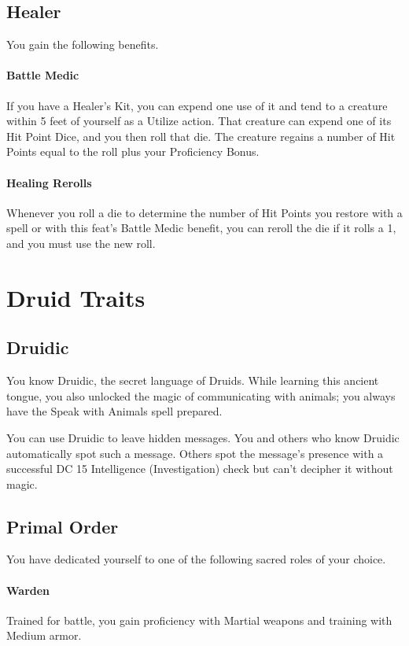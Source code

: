 \documentclass[letterpaper,openany,oneside,twocolumn]{book}
\begin{document}
\subsection*{Healer}
You gain the following benefits.

\paragraph*{Battle Medic} If you have a Healer's Kit, you can expend one use of it and tend to a creature within 5 feet of yourself as a Utilize action. That creature can expend one of its Hit Point Dice, and you then roll that die. The creature regains a number of Hit Points equal to the roll plus your Proficiency Bonus.

\paragraph*{Healing Rerolls} Whenever you roll a die to determine the number of Hit Points you restore with a spell or with this feat's Battle Medic benefit, you can reroll the die if it rolls a 1, and you must use the new roll.

\section*{Druid Traits}
\subsection*{Druidic}
You know Druidic, the secret language of Druids. While learning this ancient tongue, you also unlocked the magic of communicating with animals; you always have the Speak with Animals spell prepared.

You can use Druidic to leave hidden messages. You and others who know Druidic automatically spot such a message. Others spot the message's presence with a successful DC 15 Intelligence (Investigation) check but can't decipher it without magic.
\subsection*{Primal Order}
You have dedicated yourself to one of the following sacred roles of your choice.

\paragraph*{Warden} Trained for battle, you gain proficiency with Martial weapons and training with Medium armor.
\end{document}
